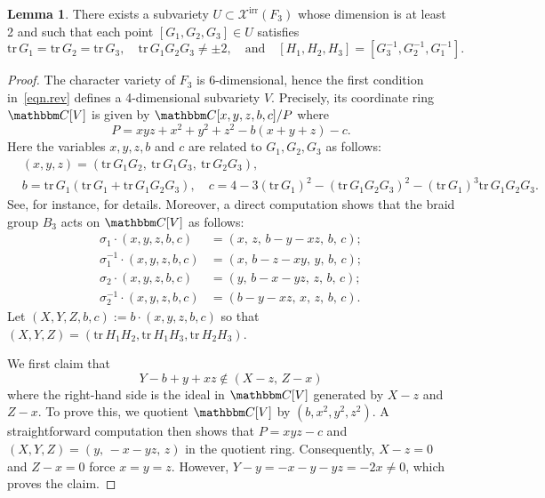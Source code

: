 \documentclass[12pt,reqno]{amsart}
\theoremstyle{definition}
\newtheorem{lemma}[theorem]{Lemma}
\def\BC{\mathbbm C}
\def\calX{\mathcal X}
\def\tr{\mathrm{tr}\,}
\begin{document}
\begin{lemma}
    There exists a subvariety $U \subset \calX^{\mathrm{irr}}(F_3)$ whose dimension is at least 2 and such that each point $[G_1,G_2,G_3] \in U$ satisfies
    \begin{equation}
    \label{eqn.rev}
    \tr G_1 = \tr G_2 = \tr G_3, \quad \tr G_1 G_2 G_3 \neq \pm 2, \quad \text{and} \quad 
    [H_1,H_2,H_3] = [G_3^{-1},G_2^{-1},G_1^{-1}] .
\end{equation}
\end{lemma}
\begin{proof}
     The character variety of $F_3$ is 6-dimensional, hence the first condition in~\eqref{eqn.rev} defines a 4-dimensional subvariety $V$. Precisely, its coordinate ring $\BC[V]$ is given by $\BC[x,y,z,b,c]/P$ where 
$$P=xyz+x^2+y^2+z^2-b(x+y+z) - c.$$
Here the variables $x,y,z,b$ and $c$ are related to $G_1,G_2,G_3$ as follows: 
\begin{align*}
    & (x,y,z)= (\tr G_1 G_2, \ \tr G_1 G_3 , \ \tr G_2 G_3), \\
    &b=\tr G_1(\tr G_1+\tr G_1 G_2 G_3), \quad c = 4-3(\tr G_1)^2 -(\tr G_1 G_2 G_3)^2 - (\tr G_1)^3 \tr G_1 G_2 G_3.
\end{align*}
See, for instance,  \cite{goldman2009trace} for details.
Moreover, a direct computation shows that the braid group $B_3$ acts on $\BC[V]$ as follows:
\begin{align*}
    \sigma_1 \cdot (x,y,z,b,c) & = (x, \, z, \, b -y-xz,\, b,\, c); \\
    \sigma_1^{-1} \cdot (x,y,z,b,c) & = (x,\, b -z-xy,\, y,\, b,\, c);\\
    \sigma_2 \cdot (x,y,z,b,c) & = (y,\, b-x-yz,\, z,\, b,\, c);\\
    \sigma_2^{-1} \cdot (x,y,z,b,c) & = (b -y-xz,\, x,\, z,\, b,\,c).
\end{align*}
 Let $(X,Y,Z,b,c) := b \cdot (x,y,z,b,c)$ so that $(X,Y,Z)=(\tr H_1 H_2, \tr H_1 H_3, \tr H_2 H_3)$. 

 
 We first claim that
\begin{equation}
    \label{eqn.claim}
    Y-b+y+xz \notin (X-z, \, Z-x)
\end{equation}
where the right-hand side is the ideal in $\BC[V]$ generated by $X-z$ and $Z-x$. To prove this, we quotient $\BC[V]$ by $(b,x^2,y^2,z^2)$. A straightforward computation then shows that $P=xyz-c$ and $(X,Y,Z)=(y,\,-x-yz,\,z)$ in the quotient ring. Consequently, $X-z=0$ and $Z-x=0$ force $x=y=z$. However, $Y-y=-x-y-yz =-2x\neq 0$, which proves the claim.


\end{proof}
\end{document}
